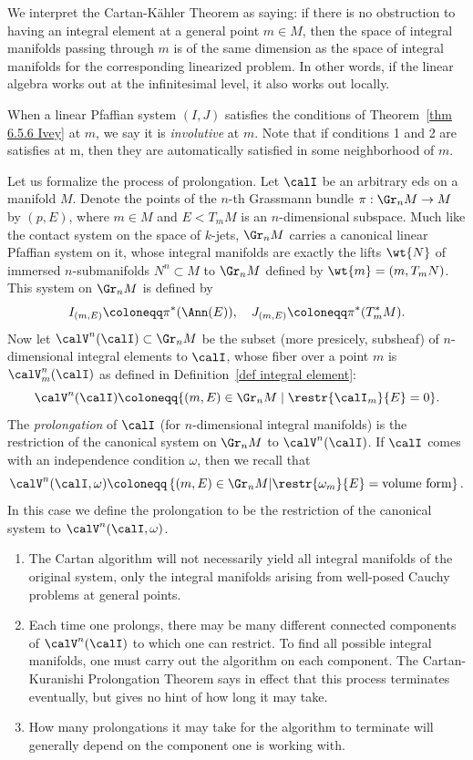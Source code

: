 We interpret the Cartan-K\"ahler Theorem as saying: if there is no obstruction to having an integral element at a general point $m\in M$, then the space of integral manifolds passing through $m$ is of the same dimension as the space of integral manifolds for the corresponding linearized problem. In other words, if the linear algebra works out at the infinitesimal level, it also works out locally.

When a linear Pfaffian system $(I,J)$ satisfies the conditions of Theorem~\ref{thm 6.5.6 Ivey} at $m$, we say it is \emph{involutive} at $m$. Note that if conditions 1 and 2 are satisfies at m, then they are automatically satisfied in some neighborhood of $m$.

Let us formalize the process of prolongation. Let $\calI$ be an arbitrary \gls{eds} on a manifold $M$. Denote the points of the $n$-th Grassmann bundle $\pi:\Gr_n M\to M$ by $(p,E)$, where $m\in M$ and $E<T_mM$ is an $n$-dimensional subspace. Much like the contact system on the space of $k$-jets, $\Gr_n M$ carries a canonical linear Pfaffian system on it, whose integral manifolds are exactly the lifts $\wt{N}$ of immersed $n$-submanifolds $N^n\subset M$ to $\Gr_n M$ defined by $\wt{m}=(m,T_m N)$. This system on $\Gr_n M$ is defined by 
\[I_{(m,E)}\coloneqq \pi^\ast(\Ann (E)),\quad J_{(m,E)}\coloneqq \pi^\ast(T_m^\ast M).\]
Now let $\calV^n(\calI)\subset \Gr_n M$ be the subset (more presicely, subsheaf) of $n$-dimensional integral elements to $\calI$, whose fiber over a point $m$ is $\calV^n_m(\calI)$ as defined in Definition~\ref{def integral element}:
\[\calV^n(\calI)\coloneqq \{(m,E)\in \Gr_n M\mid \restr{\calI_m}{E}=0\}.\]
The \emph{prolongation} of $\calI$ (for $n$-dimensional integral manifolds) is the restriction of the canonical system on $\Gr_n M$ to $\calV^n(\calI)$.  If $\calI$ comes with an independence condition $\omega$, then we recall that 
\[\calV^n(\calI,\omega)\coloneqq \left\{(m,E)\in \Gr_n M\middle| \restr{\omega_m}{E}=\text{volume form}\right\}.\]
In this case we define the prolongation to be the restriction of the canonical system to $\calV^n(\calI,\omega)$.

\begin{rem}
    \begin{enumerate}
        \item The Cartan algorithm will not necessarily yield all integral manifolds of the original system, only the integral manifolds arising from well-posed Cauchy problems at general points.
        \item Each time one prolongs, there may be many different connected components of $\calV^n(\calI)$ to which one can restrict. To find all possible integral manifolds, one must carry out the algorithm on each component. The Cartan-Kuranishi Prolongation Theorem says in effect that this process terminates eventually, but gives no hint of how long it may take.
        \item How many prolongations it may take for the algorithm to terminate will generally depend on the component one is working with.
    \end{enumerate}
\end{rem}


